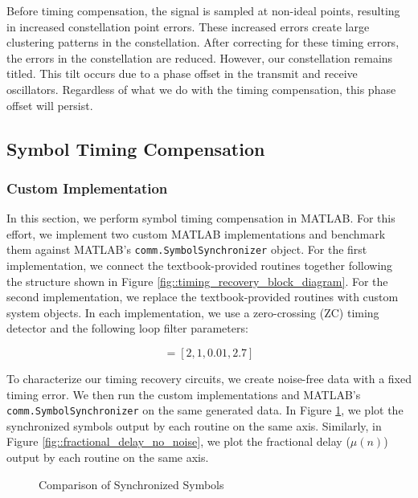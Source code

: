 \documentclass{article}
\begin{document}
\noindent Before timing compensation, the signal is sampled at non-ideal points, resulting in increased constellation point errors. These increased errors create large clustering patterns in the constellation. After correcting for these timing errors, the errors in the constellation are reduced. However, our constellation remains titled. This tilt occurs due to a phase offset in the transmit and receive oscillators. Regardless of what we do with the timing compensation, this phase offset will persist.

\subsection{Symbol Timing Compensation}
\label{section::symbol_timing_compensation}

\subsubsection{Custom Implementation}

In this section, we perform symbol timing compensation in MATLAB. For this effort, we implement two custom MATLAB implementations and benchmark them against MATLAB's \texttt{comm.SymbolSynchronizer} object. For the first implementation, we connect the textbook-provided routines together following the structure shown in Figure \ref{fig::timing_recovery_block_diagram}. For the second implementation, we replace the textbook-provided routines with custom system objects. In each implementation, we use a zero-crossing (ZC) timing detector and the following loop filter parameters:

\begin{equation*}
	[N, \zeta, B_{loop}, G_D] = [2, 1, 0.01, 2.7]
\end{equation*}

\noindent To characterize our timing recovery circuits, we create noise-free data with a fixed timing error. We then run the custom implementations and MATLAB's \texttt{comm.SymbolSynchronizer} on the same generated data. In Figure \ref{fig::symbol_sync_no_noise}, we plot the synchronized symbols output by each routine on the same axis. Similarly, in Figure \ref{fig::fractional_delay_no_noise}, we plot the fractional delay ($\mu(n)$) output by each routine on the same axis.

\begin{figure}[H]
	\centerline{}
	\caption{Comparison of Synchronized Symbols}
	\label{fig::symbol_sync_no_noise}
\end{figure}
\end{document}
